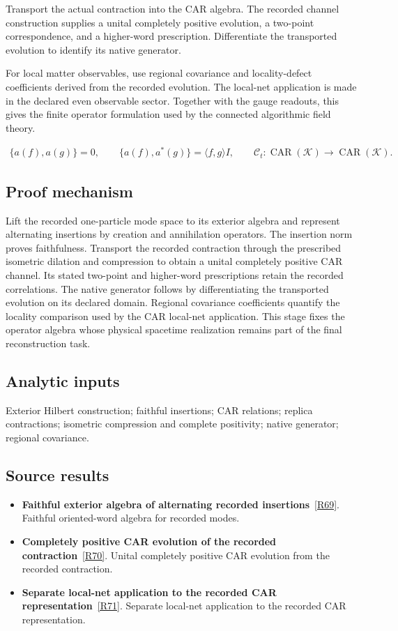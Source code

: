 \documentclass[11pt,a4paper]{article}
\begin{document}
Transport the actual contraction into the CAR algebra. The recorded channel construction supplies a unital completely positive evolution, a two-point correspondence, and a higher-word prescription. Differentiate the transported evolution to identify its native generator.

For local matter observables, use regional covariance and locality-defect coefficients derived from the recorded evolution. The local-net application is made in the declared even observable sector. Together with the gauge readouts, this gives the finite operator formulation used by the connected algorithmic field theory.


\begin{gather*}
\{a(f),a(g)\}=0,\qquad \{a(f),a^*(g)\}=\langle f,g\rangle I,
\qquad \mathcal C_t:\operatorname{CAR}(\mathcal K)\to\operatorname{CAR}(\mathcal K).
\end{gather*}
\subsection*{Proof mechanism}
Lift the recorded one-particle mode space to its exterior algebra and represent alternating insertions by creation and annihilation operators. The insertion norm proves faithfulness. Transport the recorded contraction through the prescribed isometric dilation and compression to obtain a unital completely positive CAR channel. Its stated two-point and higher-word prescriptions retain the recorded correlations. The native generator follows by differentiating the transported evolution on its declared domain. Regional covariance coefficients quantify the locality comparison used by the CAR local-net application. This stage fixes the operator algebra whose physical spacetime realization remains part of the final reconstruction task.
\subsection*{Analytic inputs}
Exterior Hilbert construction; faithful insertions; CAR relations; replica contractions; isometric compression and complete positivity; native generator; regional covariance.
\subsection*{Source results}
\begin{itemize}
\item \textbf{Faithful exterior algebra of alternating recorded insertions}~\hyperref[src:thm-lqft-oriented-word-algebra]{[R69]}. Faithful oriented-word algebra for recorded modes.
\item \textbf{Completely positive CAR evolution of the recorded contraction}~\hyperref[src:thm-lqft-record-car-channel]{[R70]}. Unital completely positive CAR evolution from the recorded contraction.
\item \textbf{Separate local-net application to the recorded CAR representation}~\hyperref[src:thm-ym-hk-record-instantiation]{[R71]}. Separate local-net application to the recorded CAR representation.
\end{itemize}
\end{document}
